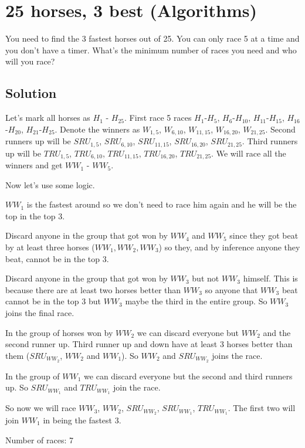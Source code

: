 \section{25 horses, 3 best (Algorithms)}
You need to find the 3 fastest horses out of 25. You can only race 5 at a time and you don't have a timer. What's
the minimum number of races you need and who will you race?

\subsection{Solution}
Let's mark all horses as $H_1$ - $H_{25}$.
First race 5 races $H_1$-$H_5$, $H_6$-$H_{10}$, $H_{11}$-$H_{15}$, $H_{16}$-$H_{20}$, $H_{21}$-$H_{25}$.
Denote the winners as $W_{1,5}$, $W_{6,10}$, $W_{11,15}$, $W_{16,20}$, $W_{21,25}$. 
Second runners up will be $SRU_{1,5}$, $SRU_{6,10}$, $SRU_{11,15}$, $SRU_{16,20}$, $SRU_{21,25}$.
Third runners up will be $TRU_{1,5}$, $TRU_{6,10}$, $TRU_{11,15}$, $TRU_{16,20}$, $TRU_{21,25}$.
We will race all the winners and get $WW_1$ - $WW_5$.

Now let's use some logic.

$WW_1$ is the fastest around so we don't need to race him again and he will be the top in the top 3.

Discard anyone in the group that got won by $WW_4$ and $WW_5$ since they got beat by at least three horses ($WW_1, WW_2, WW_3$) so they, and by inference anyone they beat, cannot be in the top 3.

Discard anyone in the group that got won by $WW_3$ but not $WW_3$ himself. This is because there are at least two horses better than $WW_3$ so anyone that $WW_3$ beat cannot be in the top 3 but $WW_3$ maybe the third in the entire group. So $WW_3$ joins the final race.

In the group of horses won by $WW_2$ we can discard everyone but $WW_2$ and the second runner up. Third runner up and down have at least 3 horses better than them ($SRU_{WW_2}$, $WW_2$ and $WW_1$). So $WW_2$ and $SRU_{WW_2}$ joins the race.

In the group of $WW_1$ we can discard everyone but the second and third runners up. So $SRU_{WW_1}$ and $TRU_{WW_1}$ join the race.

So now we will race $WW_3$, $WW_2$, $SRU_{WW_2}$, $SRU_{WW_1}$, $TRU_{WW_1}$. The first two will join $WW_1$ in being the fastest 3.

Number of races: 7

